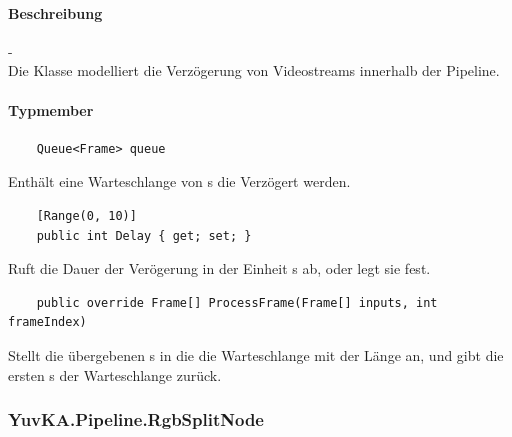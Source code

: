 \paragraph{Beschreibung}-\\
Die Klasse  modelliert die Verzögerung von Videostreams innerhalb der Pipeline.

\paragraph{Typmember}
\begin{itemize}

	\begin{verbatim}
	Queue<Frame> queue
	\end{verbatim}
	Enthält eine Warteschlange von s die Verzögert werden.
	
	\begin{verbatim}
	[Range(0, 10)]
	public int Delay { get; set; }
	\end{verbatim}
	Ruft die Dauer der Verögerung in der Einheit s ab, oder legt sie fest.

	\begin{verbatim}
	public override Frame[] ProcessFrame(Frame[] inputs, int frameIndex)
	\end{verbatim}
	Stellt die übergebenen s in die die Warteschlange  mit der Länge  an, und gibt die ersten s der Warteschlange zurück.
	
\end{itemize}

\subsubsection{YuvKA.Pipeline.RgbSplitNode}

